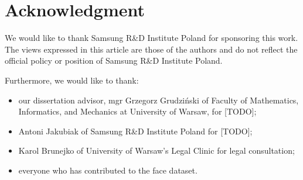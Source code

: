 \section*{Acknowledgment}
%
%

We would like to thank Samsung R\&D Institute Poland for sponsoring this work.
The views expressed in this article are those of the authors and do not reflect
the official policy or position of Samsung R\&D Institute Poland.

\bigskip \noindent
Furthermore, we would like to thank:
\begin{itemize}
    \item our dissertation advisor,  mgr Grzegorz Grudziński of Faculty of Mathematics,
          Informatics, and Mechanics at University of Warsaw, for [TODO];
    \item Antoni Jakubiak of Samsung R\&D Institute Poland for [TODO];
    \item Karol Brunejko of University of Warsaw's Legal Clinic for legal consultation;
    \item everyone who has contributed to the face dataset.
\end{itemize}
